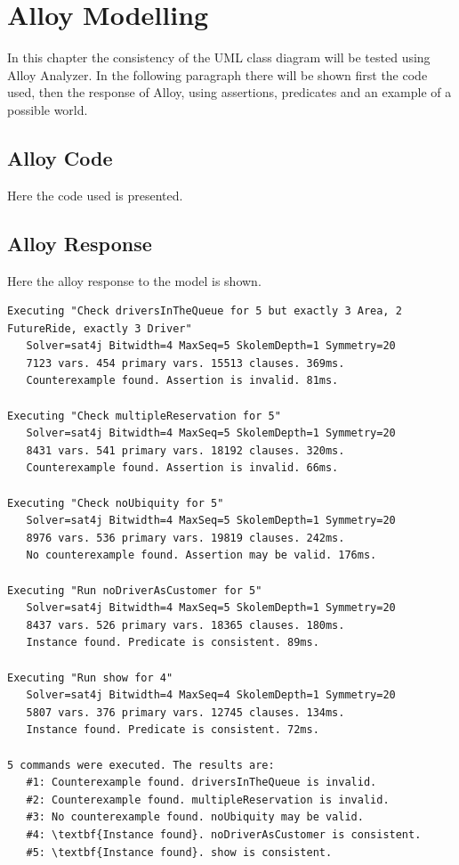 \chapter{Alloy Modelling}
\label{alloy}

In this chapter the consistency of the UML class diagram will be tested using Alloy Analyzer. In the following paragraph there will be shown first the code used, then the response of Alloy, using assertions, predicates and an example of a possible world.

\section{Alloy Code}
Here the code used is presented.



\clearpage

\section{Alloy Response}
Here the alloy response to the model is shown.
\begin{Verbatim}[commandchars=\\\{\},codes={\catcode`$=3\catcode`_=8}]
Executing "Check driversInTheQueue for 5 but exactly 3 Area, 2 FutureRide, exactly 3 Driver"
   Solver=sat4j Bitwidth=4 MaxSeq=5 SkolemDepth=1 Symmetry=20
   7123 vars. 454 primary vars. 15513 clauses. 369ms.
   Counterexample found. Assertion is invalid. 81ms.

Executing "Check multipleReservation for 5"
   Solver=sat4j Bitwidth=4 MaxSeq=5 SkolemDepth=1 Symmetry=20
   8431 vars. 541 primary vars. 18192 clauses. 320ms.
   Counterexample found. Assertion is invalid. 66ms.

Executing "Check noUbiquity for 5"
   Solver=sat4j Bitwidth=4 MaxSeq=5 SkolemDepth=1 Symmetry=20
   8976 vars. 536 primary vars. 19819 clauses. 242ms.
   No counterexample found. Assertion may be valid. 176ms.

Executing "Run noDriverAsCustomer for 5"
   Solver=sat4j Bitwidth=4 MaxSeq=5 SkolemDepth=1 Symmetry=20
   8437 vars. 526 primary vars. 18365 clauses. 180ms.
   Instance found. Predicate is consistent. 89ms.

Executing "Run show for 4"
   Solver=sat4j Bitwidth=4 MaxSeq=4 SkolemDepth=1 Symmetry=20
   5807 vars. 376 primary vars. 12745 clauses. 134ms.
   Instance found. Predicate is consistent. 72ms.

5 commands were executed. The results are:
   #1: Counterexample found. driversInTheQueue is invalid.
   #2: Counterexample found. multipleReservation is invalid.
   #3: No counterexample found. noUbiquity may be valid.
   #4: \textbf{Instance found}. noDriverAsCustomer is consistent.
   #5: \textbf{Instance found}. show is consistent.
\end{Verbatim}

